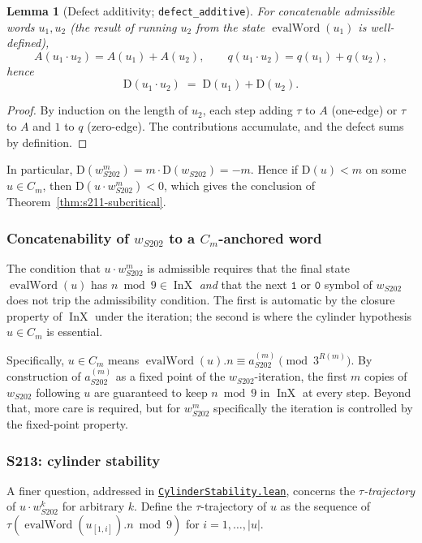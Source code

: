 \documentclass[11pt,a4paper]{article}
\theoremstyle{plain}
\newtheorem{lemma}[theorem]{Lemma}
\theoremstyle{definition}
\newcommand{\aSat}{a_{S202}^{(m)}}
\newcommand{\wS}{w_{S202}}
\newcommand{\defect}{\mathrm{D}}
\DeclareMathOperator{\InX}{InX}
\DeclareMathOperator{\evalWord}{evalWord}
\begin{document}
\begin{lemma}[Defect additivity; \texttt{defect\_additive}]
\label{lem:defect-additive}
For concatenable admissible words $u_1, u_2$ (the result of
running $u_2$ from the state $\evalWord(u_1)$ is well-defined),
\[
   A(u_1 \cdot u_2) = A(u_1) + A(u_2),
   \qquad
   q(u_1 \cdot u_2) = q(u_1) + q(u_2),
\]
hence
\[
   \defect(u_1 \cdot u_2) \;=\; \defect(u_1) + \defect(u_2).
\]
\end{lemma}

\begin{proof}
By induction on the length of $u_2$, each step adding $\tau$ to
$A$ (one-edge) or $\tau$ to $A$ and $1$ to $q$ (zero-edge). The
contributions accumulate, and the defect sums by definition.
\end{proof}

In particular, $\defect(\wS^m) = m \cdot \defect(\wS) = -m$.
Hence if $\defect(u) < m$ on some $u \in C_m$, then
$\defect(u \cdot \wS^m) < 0$, which gives the conclusion of
Theorem~\ref{thm:s211-subcritical}.

\subsubsection*{Concatenability of $\wS$ to a $C_m$-anchored word}

The condition that $u \cdot \wS^m$ is admissible requires that the
final state $\evalWord(u)$ has $n \bmod 9 \in \InX$ \emph{and}
that the next $\mathtt{1}$ or $\mathtt{0}$ symbol of $\wS$ does
not trip the admissibility condition. The first is automatic by
the closure property of $\InX$ under the iteration; the second is
where the cylinder hypothesis $u \in C_m$ is essential.

Specifically, $u \in C_m$ means
$\evalWord(u).n \equiv \aSat \pmod{3^{R(m)}}$. By
construction of $\aSat$ as a fixed point of the $\wS$-iteration,
the first $m$ copies of $\wS$ following $u$ are guaranteed to
keep $n \bmod 9$ in $\InX$ at every step. Beyond that, more
care is required, but for $\wS^m$ specifically the iteration is
controlled by the fixed-point property.

\subsubsection*{S213: cylinder stability}

A finer question, addressed in
\href{run:CollatzLean4/CollatzLean4/CylinderStability.lean}%
{\texttt{CylinderStability.lean}}, concerns the
\emph{$\tau$-trajectory} of $u \cdot \wS^k$ for arbitrary $k$. Define
the $\tau$-trajectory of $u$ as the sequence of
$\tau(\evalWord(u_{[1, i]}).n \bmod 9)$ for $i = 1, \dots, |u|$.
\end{document}
